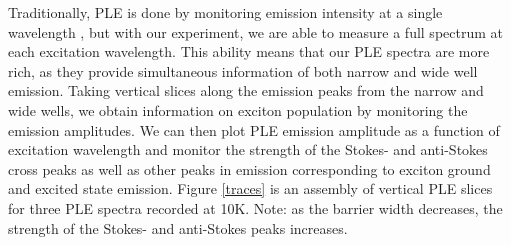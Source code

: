 \indent Traditionally, PLE is done by monitoring emission intensity at a single wavelength \cite{borri}, but with our experiment, we are able to measure a full spectrum at each excitation wavelength. This ability means that our PLE spectra are more rich, as they provide simultaneous information of both narrow and wide well emission. Taking vertical slices along the emission peaks from the narrow and wide wells, we obtain information on exciton population by monitoring the emission amplitudes. We can then plot PLE emission amplitude as a function of excitation wavelength and monitor the strength of the Stokes- and anti-Stokes cross peaks as well as other peaks in emission corresponding to exciton ground and excited state emission. Figure \ref{traces} is an assembly of vertical PLE slices for three PLE spectra recorded at 10K. Note: as the barrier width decreases, the strength of the Stokes- and anti-Stokes peaks increases. 



